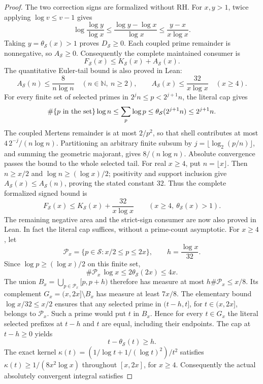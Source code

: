 \documentclass[11pt]{article}
\theoremstyle{definition}
\begin{document}
\begin{proof}
The two correction signs are formalized without RH.
For $x,y>1$, twice applying $\log v\le v-1$ gives
\[
 \log\frac{\log y}{\log x}
 \le\frac{\log y-\log x}{\log x}
 \le\frac{y-x}{x\log x}.
\]
Taking $y=\theta_{\mathcal S}(x)>1$ proves $D_{\mathcal S}\ge0$.
Each coupled prime remainder is nonnegative, so $A_{\mathcal S}\ge0$.
Consequently the complete maintained consumer is
\[
 F_{\mathcal S}(x)\le K_{\mathcal S}(x)+A_{\mathcal S}(x).
\]
The quantitative Euler-tail bound is also proved in Lean:
\[
 A_{\mathcal S}(n)\le\frac{8}{n\log n}\quad(n\in\mathbb N,\ n\ge2),
 \qquad
 A_{\mathcal S}(x)\le\frac{32}{x\log x}\quad(x\ge4).
\]
For every finite set of selected primes in \(2^j n\le p<2^{j+1}n\),
the literal cap gives
\[
 \#\{p\hbox{ in the set}\}\log n
 \le\sum_p\log p
 \le\theta_{\mathcal S}(2^{j+1}n)\le2^{j+1}n.
\]
The coupled Mertens remainder is at most \(2/p^2\), so that shell
contributes at most \(4\,2^{-j}/(n\log n)\).
Partitioning an arbitrary finite subsum by
\(j=\lfloor\log_2(p/n)\rfloor\), and summing the geometric majorant,
gives \(8/(n\log n)\). Absolute convergence passes the bound to the
whole selected tail. For real \(x\ge4\), put \(n=\lfloor x\rfloor\).
Then \(n\ge x/2\) and \(\log n\ge(\log x)/2\); positivity and support
inclusion give \(A_{\mathcal S}(x)\le A_{\mathcal S}(n)\), proving the
stated constant \(32\). Thus the complete formalized signed bound is
\[
 F_{\mathcal S}(x)\le K_{\mathcal S}(x)+\frac{32}{x\log x}
 \qquad(x\ge4,\ \theta_{\mathcal S}(x)>1).
\]
The remaining negative area and the strict-sign consumer are now also
proved in Lean. In fact the literal cap suffices, without a prime-count
asymptotic. For \(x\ge4\), let
\[
 \mathcal P_x=\{p\in\mathcal S:x/2\le p\le2x\},
 \qquad h=\frac{\log x}{32}.
\]
Since \(\log p\ge(\log x)/2\) on this finite set,
\[
 \#\mathcal P_x\,\log x
 \le2\theta_{\mathcal S}(2x)\le4x.
\]
The union \(B_x=\bigcup_{p\in\mathcal P_x}[p,p+h)\) therefore has
measure at most \(h\#\mathcal P_x\le x/8\).
Its complement \(G_x=(x,2x]\setminus B_x\) has measure at least \(7x/8\).
The elementary bound \(\log x/32\le x/2\) ensures that any selected
prime in \((t-h,t]\), for \(t\in(x,2x]\), belongs to \(\mathcal P_x\).
Such a prime would put \(t\) in \(B_x\). Hence for every \(t\in G_x\)
the literal selected prefixes at \(t-h\) and \(t\) are equal, including
their endpoints. The cap at \(t-h\ge0\) yields
\[
 t-\theta_{\mathcal S}(t)\ge h.
\]
The exact kernel
\(\kappa(t)=(1/\log t+1/(\log t)^2)/t^2\) satisfies
\(\kappa(t)\ge1/(8x^2\log x)\) throughout \([x,2x]\), for \(x\ge4\).
Consequently the actual absolutely convergent integral satisfies

\end{proof}
\end{document}
